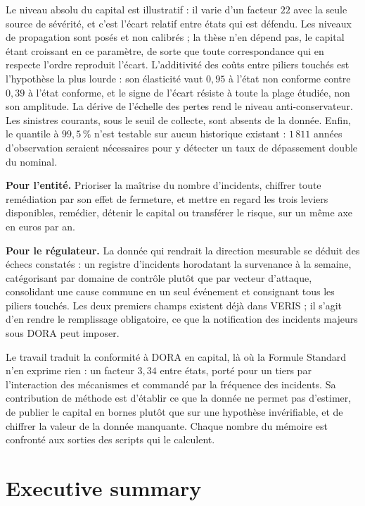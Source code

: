 Le niveau absolu du capital est illustratif : il varie d'un facteur $22$ avec la seule source de
sévérité, et c'est l'écart relatif entre états qui est défendu. Les niveaux de propagation sont
posés et non calibrés ; la thèse n'en dépend pas, le capital étant croissant en ce paramètre, de
sorte que toute correspondance qui en respecte l'ordre reproduit l'écart. L'additivité des coûts
entre piliers touchés est l'hypothèse la plus lourde : son élasticité vaut $0{,}95$ à l'état non
conforme contre $0{,}39$ à l'état conforme, et le signe de l'écart résiste à toute la plage
étudiée, non son amplitude. La dérive de l'échelle des pertes rend le niveau anti-conservateur.
Les sinistres courants, sous le seuil de collecte, sont absents de la donnée. Enfin, le quantile à
$99{,}5\,\%$ n'est testable sur aucun historique existant : $1\,811$ années d'observation seraient
nécessaires pour y détecter un taux de dépassement double du nominal.

\textbf{Pour l'entité.} Prioriser la maîtrise du nombre d'incidents, chiffrer toute remédiation par
son effet de fermeture, et mettre en regard les trois leviers disponibles, remédier, détenir le
capital ou transférer le risque, sur un même axe en euros par an.

\textbf{Pour le régulateur.} La donnée qui rendrait la direction mesurable se déduit des échecs
constatés : un registre d'incidents horodatant la survenance à la semaine, catégorisant par domaine
de contrôle plutôt que par vecteur d'attaque, consolidant une cause commune en un seul
événement et consignant tous les piliers touchés. Les deux premiers champs existent déjà dans VERIS ; il s'agit d'en rendre le
remplissage obligatoire, ce que la notification des incidents majeurs sous DORA peut imposer.

Le travail traduit la conformité à DORA en capital, là où la Formule Standard n'en exprime rien :
un facteur $3{,}34$ entre états, porté pour un tiers par l'interaction des mécanismes et commandé
par la fréquence des incidents. Sa contribution de méthode est d'établir ce que la donnée ne
permet pas d'estimer, de publier le capital en bornes plutôt que sur une hypothèse invérifiable, et
de chiffrer la valeur de la donnée manquante. Chaque nombre du mémoire est confronté aux sorties
des scripts qui le calculent.


\chapter*{Executive summary}

